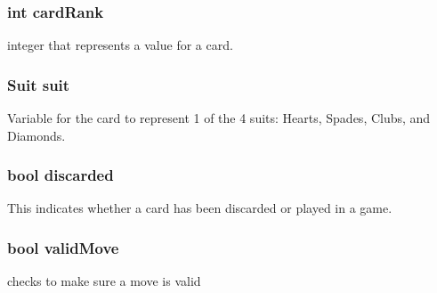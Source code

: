     \subsubsection
    {
      int cardRank
    }
    integer that represents a value for a card.
    
\subsubsection
    {
      Suit suit
    }
    Variable for the card to represent 1 of the 4 suits: Hearts, Spades, Clubs, and Diamonds.
    
\subsubsection
    {
      bool discarded
    }
    This indicates whether a card has been discarded or
      played in a game.
    
\subsubsection
    {
      bool validMove
    }
    checks to make sure a move is valid
